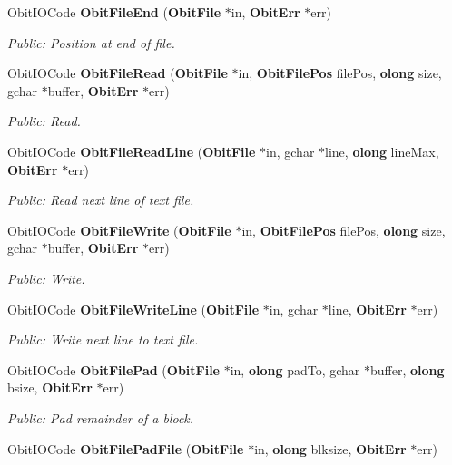 \begin{CompactItemize}
Obit\-IOCode {\bf Obit\-File\-End} ({\bf Obit\-File} $\ast$in, {\bf Obit\-Err} $\ast$err)
\begin{CompactList}\small\item\em Public: Position at end of file. \item\end{CompactList}\item 
Obit\-IOCode {\bf Obit\-File\-Read} ({\bf Obit\-File} $\ast$in, {\bf Obit\-File\-Pos} file\-Pos, {\bf olong} size, gchar $\ast$buffer, {\bf Obit\-Err} $\ast$err)
\begin{CompactList}\small\item\em Public: Read. \item\end{CompactList}\item 
Obit\-IOCode {\bf Obit\-File\-Read\-Line} ({\bf Obit\-File} $\ast$in, gchar $\ast$line, {\bf olong} line\-Max, {\bf Obit\-Err} $\ast$err)
\begin{CompactList}\small\item\em Public: Read next line of text file. \item\end{CompactList}\item 
Obit\-IOCode {\bf Obit\-File\-Write} ({\bf Obit\-File} $\ast$in, {\bf Obit\-File\-Pos} file\-Pos, {\bf olong} size, gchar $\ast$buffer, {\bf Obit\-Err} $\ast$err)
\begin{CompactList}\small\item\em Public: Write. \item\end{CompactList}\item 
Obit\-IOCode {\bf Obit\-File\-Write\-Line} ({\bf Obit\-File} $\ast$in, gchar $\ast$line, {\bf Obit\-Err} $\ast$err)
\begin{CompactList}\small\item\em Public: Write next line to text file. \item\end{CompactList}\item 
Obit\-IOCode {\bf Obit\-File\-Pad} ({\bf Obit\-File} $\ast$in, {\bf olong} pad\-To, gchar $\ast$buffer, {\bf olong} bsize, {\bf Obit\-Err} $\ast$err)
\begin{CompactList}\small\item\em Public: Pad remainder of a block. \item\end{CompactList}\item 
Obit\-IOCode {\bf Obit\-File\-Pad\-File} ({\bf Obit\-File} $\ast$in, {\bf olong} blksize, {\bf Obit\-Err} $\ast$err)

\end{CompactItemize}
